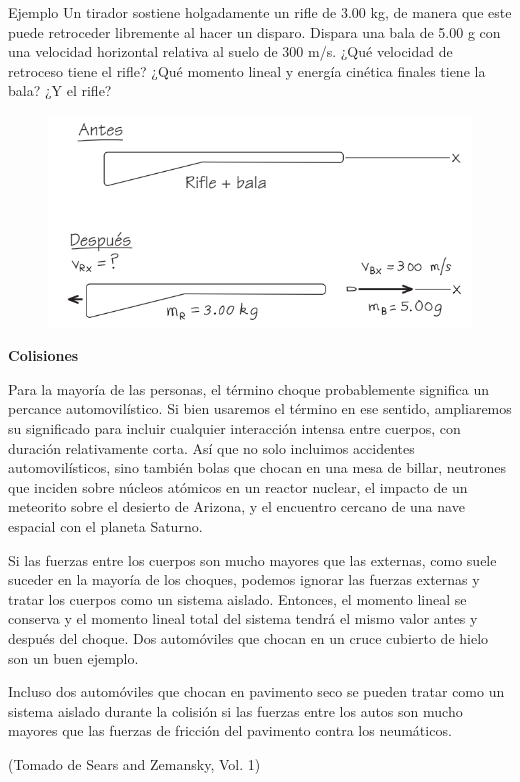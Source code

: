     \begin{frame}{Ejemplo}
        Un tirador sostiene holgadamente un rifle de 3.00 kg, de manera que este puede retroceder libremente al hacer un disparo. Dispara una bala de 5.00 g con una velocidad horizontal relativa al suelo de 300 m/s. ¿Qué velocidad de retroceso tiene el rifle? ¿Qué momento lineal y energía cinética finales tiene la bala? ¿Y el rifle?

        \begin{figure}
            \centering
            \includegraphics[width=0.5\linewidth]{figures/rifle.png}
        \end{figure}
    \end{frame}

    \begin{frame}
    \begin{center}
        \Huge \textbf{Colisiones}
    \end{center}
\end{frame}

\begin{frame}
    \footnotesize Para la mayoría de las personas, el término choque probablemente significa un percance
automovilístico. Si bien usaremos el término en ese sentido, ampliaremos su significado
para incluir cualquier interacción intensa entre cuerpos, con duración relativamente
corta. Así que no solo incluimos accidentes automovilísticos, sino también bolas que
chocan en una mesa de billar, neutrones que inciden sobre núcleos atómicos en un reactor nuclear, el impacto de un meteorito sobre el desierto de Arizona, y el encuentro cercano de una nave espacial con el planeta Saturno.

Si las fuerzas entre los cuerpos son mucho mayores que las externas, como suele
suceder en la mayoría de los choques, podemos ignorar las fuerzas externas y tratar
los cuerpos como un sistema aislado. Entonces, el momento lineal se conserva y el
momento lineal total del sistema tendrá el mismo valor antes y después del choque.
Dos automóviles que chocan en un cruce cubierto de hielo son un buen ejemplo.

Incluso dos automóviles que chocan en pavimento seco se pueden tratar como un sistema aislado durante la colisión si las fuerzas entre los autos son mucho mayores que
las fuerzas de fricción del pavimento contra los neumáticos.

\vspace{2em}\raggedleft (Tomado de Sears and Zemansky, Vol. 1)
\end{frame}

